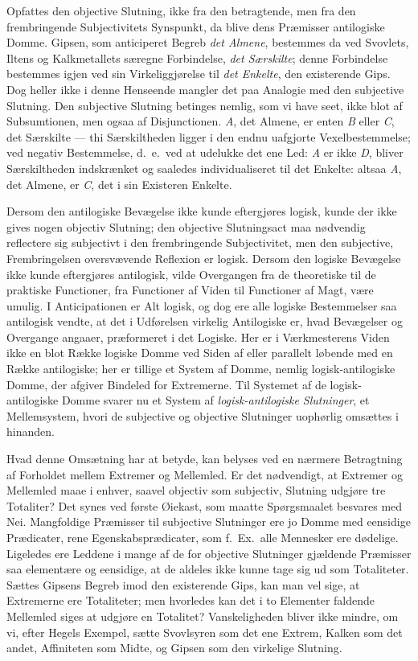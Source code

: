 \documentclass[12pt]{book}
\newcommand{\opage}[1]{\marginnote{\footnotesize\textit{[#1]}}}
\begin{document}
Opfattes den objective Slutning, ikke fra den betragtende, men fra den frembringende Subjectivitets Synspunkt, da blive dens Præmisser antilogiske Domme. Gipsen, som anticiperet Begreb \emph{det Almene}, bestemmes da ved Svovlets, Iltens og Kalkmetallets særegne Forbindelse, \emph{det Særskilte}; denne Forbindelse bestemmes igjen ved sin Virkeliggjørelse til \emph{det Enkelte}, den existerende Gips. Dog heller ikke i denne Henseende mangler det paa Analogie med den subjective Slutning. Den subjective Slutning betinges nemlig, som vi have seet, ikke blot af Subsumtionen, men ogsaa af Disjunctionen. \textit{A}, det Almene, er enten \textit{B} eller \textit{C}, det Særskilte --- thi Særskiltheden ligger i den endnu uafgjorte Vexelbestemmelse; ved negativ Bestemmelse, d.\ e.\ ved at udelukke det ene Led: \textit{A} er ikke \textit{D}, bliver Særskiltheden indskrænket og saaledes individualiseret til det Enkelte: altsaa \textit{A}, det Almene, er \textit{C}, det i sin Existeren Enkelte.

Dersom den antilogiske Bevægelse ikke kunde eftergjøres logisk, kunde der ikke gives nogen objectiv Slutning; den objective Slutningsact maa nødvendig reflectere sig subjectivt i
\opage{400}den frembringende Subjectivitet, men den subjective, Frembringelsen oversvævende Reflexion er logisk. Dersom den logiske Bevægelse ikke kunde eftergjøres antilogisk, vilde Overgangen fra de theoretiske til de praktiske Functioner, fra Functioner af Viden til Functioner af Magt, være umulig. I Anticipationen er Alt logisk, og dog ere alle logiske Bestemmelser saa antilogisk vendte, at det i Udførelsen virkelig Antilogiske er, hvad Bevægelser og Overgange angaaer, præformeret i det Logiske. Her er i Værkmesterens Viden ikke en blot Række logiske Domme ved Siden af eller parallelt løbende med en Række antilogiske; her er tillige et System af Domme, nemlig logisk-antilogiske Domme, der afgiver Bindeled for Extremerne. Til Systemet af de logisk-antilogiske Domme svarer nu et System af \emph{logisk-antilogiske Slutninger}, et Mellemsystem, hvori de subjective og objective Slutninger uophørlig omsættes i hinanden.

Hvad denne Omsætning har at betyde, kan belyses ved en nærmere Betragtning af Forholdet mellem Extremer og Mellemled. Er det nødvendigt, at Extremer og Mellemled maae i enhver, saavel objectiv som subjectiv, Slutning udgjøre tre Totaliter? %
Det synes ved første Øiekast, som maatte Spørgsmaalet besvares med Nei. Mangfoldige Præmisser til subjective Slutninger ere jo Domme med eensidige Prædicater, rene Egenskabsprædicater, som f.\ Ex.\ alle Mennesker ere dødelige. Ligeledes ere Leddene i mange af de for objective Slutninger gjældende Præmisser saa elementære og eensidige, at de aldeles ikke kunne tage sig ud som Totaliteter. Sættes Gipsens Begreb imod den existerende Gips, kan man vel sige, at Extremerne ere Totaliteter; men hvorledes kan det i to Elementer faldende Mellemled siges at udgjøre en Totalitet? Vanskeligheden bliver ikke mindre, om vi, efter Hegels Exempel, sætte Svovlsyren som det ene Extrem, Kalken som det andet, Affiniteten som Midte, og Gipsen som den virkelige Slutning.
\end{document}
